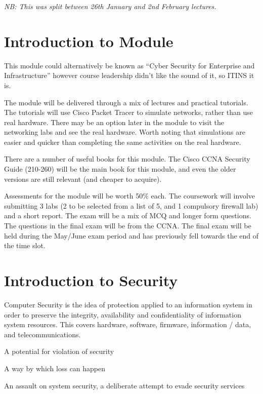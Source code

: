 
\textit{NB: This was split between 26th January and 2nd February lectures.}

\section{Introduction to Module}

This module could alternatively be known as ``Cyber Security for Enterprise and Infrastructure'' however course leadership didn't like the sound of it, so ITINS it is. 

The module will be delivered through a mix of lectures and practical tutorials. The tutorials will use Cisco Packet Tracer to simulate networks, rather than use real hardware. There may be an option later in the module to visit the networking labs and see the real hardware. Worth noting that simulations are easier and quicker than completing the same activities on the real hardware.

There are a number of useful books for this module. The Cisco CCNA Security Guide (210-260) will be the main book for this module, and even the older versions are still relevant (and cheaper to acquire). 

Assessments for the module will be worth 50\% each. The coursework will involve submitting 3 labs (2 to be selected from a list of 5, and 1 compulsory firewall lab) and a short report. The exam will be a mix of MCQ and longer form questions. The questions in the final exam will be from the CCNA. The final exam will be held during the May/June exam period and has previously fell towards the end of the time slot.

\section{Introduction to Security}
Computer Security is the idea of protection applied to an information system in order to preserve the integrity, availability and confidentiality of information system resources. This covers hardware, software, firmware, information / data, and telecommunications.

\begin{define}
\item[Threat] A potential for violation of security
\item[Vulnerability] A way by which loss can happen
\item[Attack] An assault on system security, a deliberate attempt to evade security services
\end{define}

